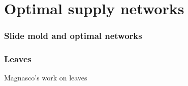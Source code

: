 \section{Optimal supply networks}

\begin{frame}
  \frametitle{Slide mold and optimal networks}

\end{frame}

\begin{frame}
  \frametitle{Leaves}

  Magnasco's work on leaves

\end{frame}

\begin{frame}
  \frametitle{}

\end{frame}
